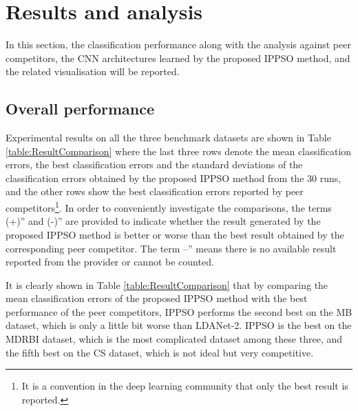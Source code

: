 \documentclass[conference]{IEEEtran}
\begin{document}
\section{Results and analysis}\label{sec:EPResults}

In this section, the classification performance along with the analysis against peer competitors, the CNN architectures learned by the proposed IPPSO method, and the related visualisation will be reported.



\subsection{Overall performance}\label{sec:Performance}

Experimental results on all the three benchmark datasets are shown in Table \ref{table:ResultComparison} where the last three rows denote the mean classification errors, the best classification errors and the standard deviations of the classification errors obtained by the proposed IPPSO method from the 30 runs, and the other rows show the best classification errors reported by peer competitors\footnote{It is a convention in the deep learning community that only the best result is reported.}. In order to conveniently investigate the comparisons, the terms (+)” and (-)” are provided to indicate whether the result generated by the proposed IPPSO method is better or worse than the best result obtained by the corresponding peer competitor. The term --” means there is no available result reported from the provider or cannot be counted.


It is clearly shown in Table \ref{table:ResultComparison} that by comparing the mean classification errors of the proposed IPPSO method with the best performance of the peer competitors, IPPSO performs the second best on the MB dataset, which is only a little bit worse than LDANet-2. IPPSO is the best on the MDRBI dataset, which is the most complicated dataset among these three, and the fifth best on the CS dataset, which is not ideal but very competitive.
\end{document}
